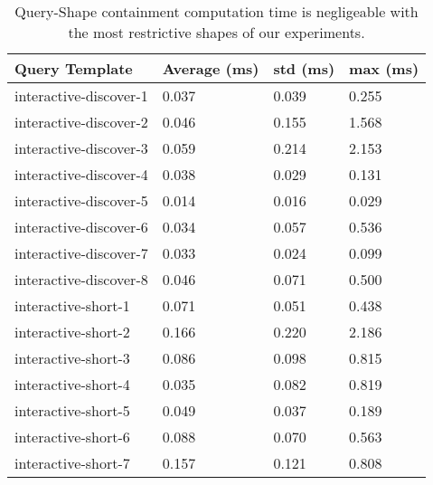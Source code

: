 \begin{table}
	\begin{center}
		\begin{tabular}{|l|l|l|l|}
			\hline
			Query Template & Average (ms) & std (ms) & max (ms) \\
			\hline
			interactive-discover-1 & 0.037 & 0.039 & 0.255 \\
			\hline
			interactive-discover-2 & 0.046 & 0.155 & 1.568 \\
			\hline
			interactive-discover-3 & 0.059 & 0.214 & 2.153 \\
			\hline
			interactive-discover-4 & 0.038 & 0.029 & 0.131 \\
			\hline
			interactive-discover-5 & 0.014 & 0.016 & 0.029 \\
			\hline
			interactive-discover-6 & 0.034 & 0.057 & 0.536 \\
			\hline
			interactive-discover-7 & 0.033 & 0.024 & 0.099 \\
			\hline
			interactive-discover-8 & 0.046 & 0.071 & 0.500 \\
			\hline
			interactive-short-1 & 0.071 & 0.051 & 0.438 \\
			\hline
			interactive-short-2 & 0.166 & 0.220 & 2.186 \\
			\hline
			interactive-short-3 & 0.086 & 0.098 & 0.815 \\
			\hline
			interactive-short-4 & 0.035 & 0.082 & 0.819 \\
			\hline
			interactive-short-5 & 0.049 & 0.037 & 0.189 \\
			\hline
			interactive-short-6 & 0.088 & 0.070 & 0.563 \\
			\hline
			interactive-short-7 & 0.157 & 0.121 & 0.808 \\
			\hline
		\end{tabular}
	\end{center}
	\caption{Query-Shape containment computation time is negligeable with the most restrictive shapes of our experiments.}
	\label{tab:queryShapeContainmentEval}
\end{table}
